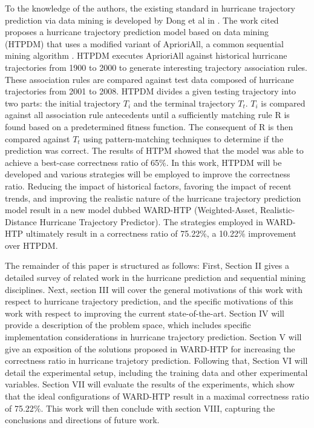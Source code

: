 \documentclass[12pt,conference]{IEEEtran}
\begin{document}
To the knowledge of the authors, the existing standard in hurricane trajectory prediction via data mining is developed by Dong et al in \cite{major-hurricane-model}. The work cited proposes a hurricane trajectory prediction model based on data mining (HTPDM) that uses a modified variant of AprioriAll, a common sequential mining algorithm \cite{AprioriAll-original}. HTPDM executes AprioriAll against historical hurricane trajectories from 1900 to 2000 to generate interesting trajectory association rules. These association rules are compared against test data composed of hurricane trajectories from 2001 to 2008. HTPDM divides a given testing trajectory into two parts: the initial trajectory $T_{i}$ and the terminal trajectory $T_{t}$. $T_{i}$ is compared against all association rule antecedents until a sufficiently matching rule R is found based on a predetermined fitness function. The consequent of R is then compared against $T_{t}$ using pattern-matching techniques to determine if the prediction was correct. The results of HTPM showed that the model was able to achieve a best-case correctness ratio of 65\%. In this work, HTPDM will be developed and various strategies will be employed to improve the correctness ratio. Reducing the impact of historical factors, favoring the impact of recent trends, and improving the realistic nature of the hurricane trajectory prediction model result in a new model dubbed WARD-HTP (Weighted-Asset, Realistic-Distance Hurricane Trajectory Predictor). The strategies employed in WARD-HTP ultimately result in a correctness ratio of 75.22\%, a 10.22\% improvement over HTPDM.

The remainder of this paper is structured as follows: First, Section II gives a detailed survey of related work in the hurricane prediction and sequential mining disciplines. Next, section III will cover the general motivations of this work with respect to hurricane trajectory prediction, and the specific motivations of this work with respect to improving the current state-of-the-art. Section IV will provide a description of the problem space, which includes specific implementation considerations in hurricane trajectory prediction. Section V will give an exposition of the solutions proposed in WARD-HTP for increasing the correctness ratio in hurricane trajetory prediction. Following that, Section VI will detail the experimental setup, including the training data and other experimental variables. Section VII will evaluate the results of the experiments, which show that the ideal configurations of WARD-HTP result in a maximal correctness ratio of 75.22\%. This work will then conclude with section VIII, capturing the conclusions and directions of future work.
\end{document}

